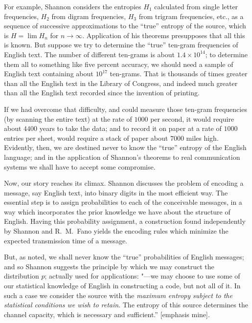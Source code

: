 For example, Shannon considers the entropies $H_1$ calculated from single letter frequencies, $H_2$ from digram frequencies, $H_3$ from trigram frequencies, etc., as a sequence of successive approximations to the ``true'' entropy of the source, which is $H=\lim H_n$ for $n\to\infty$.
Application of his theorems presupposes that all this is known.
But suppose we try to determine the ``true'' ten-gram frequencies of English text.
The number of different ten-grams is about $1.4\times 10^{14}$; to determine them all to something like five percent accuracy, we should need a sample of English text containing about $10^{17}$ ten-grams.
That is thousands of times greater than all the English text in the Library of Congress, and indeed much greater than all the English text recorded since the invention of printing.

If we had overcome that difficulty, and could measure those ten-gram frequencies (by scanning the entire text) at the rate of $1000$ per second, it would require about $4400$ years to take the data; and to record it on paper at a rate of $1000$ entries per sheet, would require a stack of paper about $7000$ miles high.
Evidently, then, we are destined never to know the ``true'' entropy of the English language; and in the application of Shannon's theorems to real communication systems we shall have to accept some compromise.

Now, our story reaches its climax.
Shannon discusses the problem of encoding a message, say English text, into binary digits in the most efficient way.
The essential step is to assign probabilities to each of the conceivable messages, in a way which incorporates the prior knowledge we have about the structure of English.
Having this probability assignment, a construction found independently by Shannon and R.~M.~Fano yields the encoding rules which minimize the expected transmission time of a message.

But, as noted, we shall never know the ``true'' probabilities of English messages; and so Shannon suggests the principle by which we may construct the distribution $p$; actually used for applications: "---we may choose to use some of our statistical knowledge of English in constructing a code, but not all of it. In such a case we consider the source with the \emph{maximum entropy subject to the statistical conditions we wish to retain}. The entropy of this source determines the channel capacity, which is necessary and sufficient.'' [emphasis mine].

